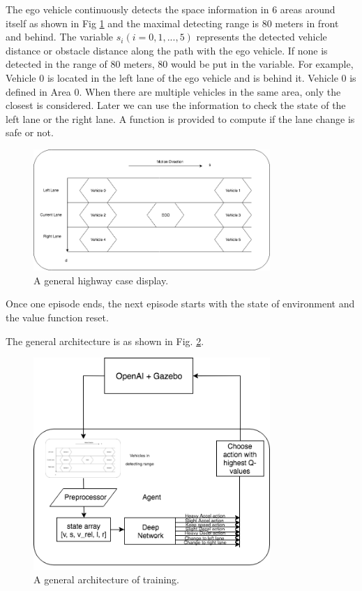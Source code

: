 The ego vehicle continuously detects the space information in 6 areas around itself as shown in Fig \ref{fig:highway} and the maximal detecting range is 80 meters in front and behind. The variable $s_i (i = 0,1,...,5)$ represents the detected vehicle distance or obstacle distance along the path with the ego vehicle. If none is detected in the range of 80 meters, 80 would be put in the variable. For example, Vehicle 0 is located in the left lane of the ego vehicle and is behind it. Vehicle 0 is defined in Area 0. When there are multiple vehicles in the same area, only the closest is considered. Later we can use the information to check the state of the left lane or the right lane. A function is provided to compute if the lane change is safe or not.

\begin{figure}[h]
\centering
\includegraphics[width=0.8\textwidth]{figs/ch4/Highway-Display}
\caption{A general highway case display.}
\label{fig:highway}
\end{figure}

Once one episode ends, the next episode starts with the state of environment and the value function reset.

The general architecture is as shown in Fig. \ref{fig:diagram}.

\begin{figure}[h]
\centering
\includegraphics[width=0.8\textwidth]{figs/ch4/diagram}
\caption{A general architecture of training.}
\label{fig:diagram}
\end{figure}

